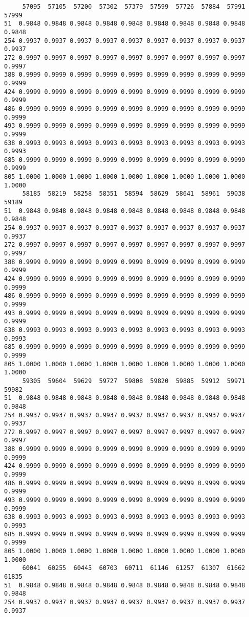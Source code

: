 \documentclass[
]{report}
\begin{document}
\begin{verbatim}
     57095  57105  57200  57302  57379  57599  57726  57884  57991  57999
51  0.9848 0.9848 0.9848 0.9848 0.9848 0.9848 0.9848 0.9848 0.9848 0.9848
254 0.9937 0.9937 0.9937 0.9937 0.9937 0.9937 0.9937 0.9937 0.9937 0.9937
272 0.9997 0.9997 0.9997 0.9997 0.9997 0.9997 0.9997 0.9997 0.9997 0.9997
388 0.9999 0.9999 0.9999 0.9999 0.9999 0.9999 0.9999 0.9999 0.9999 0.9999
424 0.9999 0.9999 0.9999 0.9999 0.9999 0.9999 0.9999 0.9999 0.9999 0.9999
486 0.9999 0.9999 0.9999 0.9999 0.9999 0.9999 0.9999 0.9999 0.9999 0.9999
493 0.9999 0.9999 0.9999 0.9999 0.9999 0.9999 0.9999 0.9999 0.9999 0.9999
638 0.9993 0.9993 0.9993 0.9993 0.9993 0.9993 0.9993 0.9993 0.9993 0.9993
685 0.9999 0.9999 0.9999 0.9999 0.9999 0.9999 0.9999 0.9999 0.9999 0.9999
805 1.0000 1.0000 1.0000 1.0000 1.0000 1.0000 1.0000 1.0000 1.0000 1.0000
     58185  58219  58258  58351  58594  58629  58641  58961  59038  59189
51  0.9848 0.9848 0.9848 0.9848 0.9848 0.9848 0.9848 0.9848 0.9848 0.9848
254 0.9937 0.9937 0.9937 0.9937 0.9937 0.9937 0.9937 0.9937 0.9937 0.9937
272 0.9997 0.9997 0.9997 0.9997 0.9997 0.9997 0.9997 0.9997 0.9997 0.9997
388 0.9999 0.9999 0.9999 0.9999 0.9999 0.9999 0.9999 0.9999 0.9999 0.9999
424 0.9999 0.9999 0.9999 0.9999 0.9999 0.9999 0.9999 0.9999 0.9999 0.9999
486 0.9999 0.9999 0.9999 0.9999 0.9999 0.9999 0.9999 0.9999 0.9999 0.9999
493 0.9999 0.9999 0.9999 0.9999 0.9999 0.9999 0.9999 0.9999 0.9999 0.9999
638 0.9993 0.9993 0.9993 0.9993 0.9993 0.9993 0.9993 0.9993 0.9993 0.9993
685 0.9999 0.9999 0.9999 0.9999 0.9999 0.9999 0.9999 0.9999 0.9999 0.9999
805 1.0000 1.0000 1.0000 1.0000 1.0000 1.0000 1.0000 1.0000 1.0000 1.0000
     59305  59604  59629  59727  59808  59820  59885  59912  59971  59982
51  0.9848 0.9848 0.9848 0.9848 0.9848 0.9848 0.9848 0.9848 0.9848 0.9848
254 0.9937 0.9937 0.9937 0.9937 0.9937 0.9937 0.9937 0.9937 0.9937 0.9937
272 0.9997 0.9997 0.9997 0.9997 0.9997 0.9997 0.9997 0.9997 0.9997 0.9997
388 0.9999 0.9999 0.9999 0.9999 0.9999 0.9999 0.9999 0.9999 0.9999 0.9999
424 0.9999 0.9999 0.9999 0.9999 0.9999 0.9999 0.9999 0.9999 0.9999 0.9999
486 0.9999 0.9999 0.9999 0.9999 0.9999 0.9999 0.9999 0.9999 0.9999 0.9999
493 0.9999 0.9999 0.9999 0.9999 0.9999 0.9999 0.9999 0.9999 0.9999 0.9999
638 0.9993 0.9993 0.9993 0.9993 0.9993 0.9993 0.9993 0.9993 0.9993 0.9993
685 0.9999 0.9999 0.9999 0.9999 0.9999 0.9999 0.9999 0.9999 0.9999 0.9999
805 1.0000 1.0000 1.0000 1.0000 1.0000 1.0000 1.0000 1.0000 1.0000 1.0000
     60041  60255  60445  60703  60711  61146  61257  61307  61662  61835
51  0.9848 0.9848 0.9848 0.9848 0.9848 0.9848 0.9848 0.9848 0.9848 0.9848
254 0.9937 0.9937 0.9937 0.9937 0.9937 0.9937 0.9937 0.9937 0.9937 0.9937

\end{verbatim}
\end{document}
